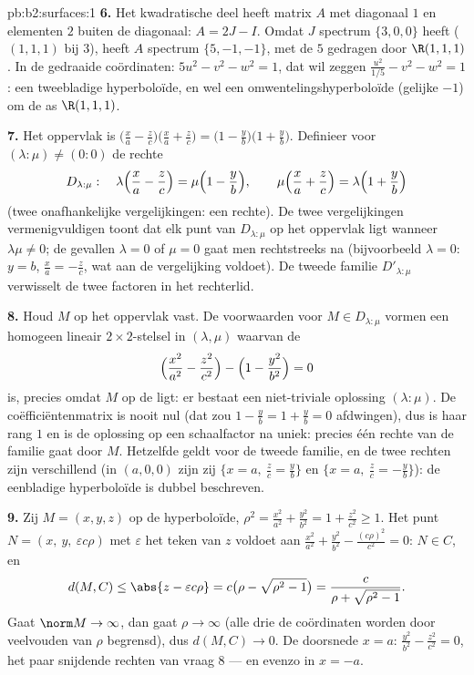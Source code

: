 \begin{solution}{pb:b2:surfaces:1}
\textbf{6.} Het kwadratische deel heeft matrix $A$ met diagonaal
$1$ en elementen $2$ buiten de diagonaal: $A = 2J - I$. Omdat $J$
spectrum $\{3, 0, 0\}$ heeft ( $(1,1,1)$ bij $3$), heeft
$A$ spectrum $\{5, -1, -1\}$, met de  $5$ gedragen door
$\R(1,1,1)$. In de gedraaide coördinaten: $5u^2 - v^2 - w^2 = 1$,
dat wil zeggen $\frac{u^2}{1/5} - v^2 - w^2 = 1$: een tweebladige
hyperboloïde, en wel een omwentelingshyperboloïde (gelijke
 $-1$) om de as $\R(1,1,1)$.

\textbf{7.} Het oppervlak is $\bigl(\frac xa - \frac
zc\bigr)\bigl(\frac xa + \frac zc\bigr) = \bigl(1 - \frac
yb\bigr)\bigl(1 + \frac yb\bigr)$. Definieer voor $(\lambda : \mu)
\neq (0:0)$ de rechte
\[
D_{\lambda:\mu} :\quad
\lambda\Bigl(\frac xa - \frac zc\Bigr) = \mu\Bigl(1 - \frac
yb\Bigr), \qquad
\mu\Bigl(\frac xa + \frac zc\Bigr) = \lambda\Bigl(1 + \frac
yb\Bigr)
\]
(twee onafhankelijke  vergelijkingen: een rechte). De twee
vergelijkingen vermenigvuldigen toont dat elk punt van
$D_{\lambda:\mu}$ op het oppervlak ligt wanneer $\lambda\mu \neq
0$; de gevallen $\lambda = 0$ of $\mu = 0$ gaat men rechtstreeks na
(bijvoorbeeld $\lambda = 0$: $y = b$, $\frac xa = -\frac zc$, wat
aan de vergelijking voldoet). De tweede familie
$D'_{\lambda:\mu}$ verwisselt de twee factoren in het rechterlid.

\textbf{8.} Houd $M$ op het oppervlak vast. De voorwaarden voor $M
\in D_{\lambda:\mu}$ vormen een homogeen lineair
$2\times2$-stelsel in $(\lambda, \mu)$ waarvan de 
\[
\Bigl(\frac{x^2}{a^2} - \frac{z^2}{c^2}\Bigr) - \Bigl(1 -
\frac{y^2}{b^2}\Bigr) = 0
\]
is, precies omdat $M$ op de  ligt: er bestaat een
niet-triviale oplossing $(\lambda : \mu)$. De
coëfficiëntenmatrix is nooit nul (dat zou $1 - \frac yb = 1 +
\frac yb = 0$ afdwingen), dus is haar rang $1$ en is de oplossing
op een schaalfactor na uniek: precies één rechte van de familie
gaat door $M$. Hetzelfde geldt voor de tweede familie, en de twee
rechten zijn verschillend (in $(a, 0, 0)$ zijn zij $\{x = a,\
\frac zc = \frac yb\}$ en $\{x = a,\ \frac zc = -\frac yb\}$): de
eenbladige hyperboloïde is dubbel beschreven.

\textbf{9.} Zij $M = (x, y, z)$ op de hyperboloïde, $\rho^2 =
\frac{x^2}{a^2} + \frac{y^2}{b^2} = 1 + \frac{z^2}{c^2} \geq 1$.
Het punt $N = (x,\ y,\ \varepsilon c\rho)$ met $\varepsilon$ het
teken van $z$ voldoet aan $\frac{x^2}{a^2} + \frac{y^2}{b^2} -
\frac{(c\rho)^2}{c^2} = 0$: $N \in C$, en
\[
d(M, C) \leq \abs{z - \varepsilon c\rho}
= c\bigl(\rho - \sqrt{\rho^2 - 1}\bigr)
= \frac{c}{\rho + \sqrt{\rho^2 - 1}} .
\]
Gaat $\norm M \to \infty$, dan gaat $\rho \to \infty$ (alle drie de
coördinaten worden door veelvouden van $\rho$ begrensd), dus $d(M,
C) \to 0$. De doorsnede $x = a$: $\frac{y^2}{b^2} -
\frac{z^2}{c^2} = 0$, het paar snijdende rechten van vraag 8 --- en
evenzo in $x = -a$.


\end{solution}
